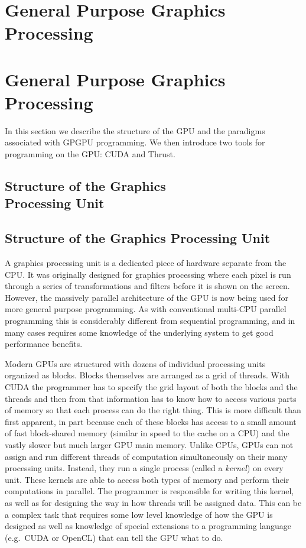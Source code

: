 \documentclass[twocolumn]{article}
\renewcommand{\|}{\origbar} %
\begin{document}
\if@twocolumn
  \section{General Purpose Graphics \\ Processing}
\else
  \section{General Purpose Graphics Processing}
\fi 
\label{sec:GPGP}

In this section we describe the structure of the GPU and the paradigms associated with GPGPU programming. We then introduce two tools for programming on the GPU: CUDA and Thrust.

\if@twocolumn
  \subsection{Structure of the Graphics \\ Processing Unit}
\else
  \subsection{Structure of the Graphics Processing Unit}
\fi

A graphics processing unit is a dedicated piece of hardware separate from the CPU. It was originally designed for graphics processing where each pixel is run through a series of transformations and filters before it is shown on the screen. However, the massively parallel architecture of the GPU is now being used for more general purpose programming. As with conventional multi-CPU parallel programming this is considerably different from sequential programming, and in many cases requires some knowledge of the underlying system to get good performance benefits. 

Modern GPUs are structured with dozens of individual processing units organized as blocks. Blocks themselves are arranged as a grid of threads. With CUDA the programmer has to specify the grid layout of both the blocks and the threads and then from that information has to know how to access various parts of memory so that each process can do the right thing. This is more difficult than first apparent, in part because each of these blocks has access to a small amount of fast block-shared memory (similar in speed to the cache on a CPU) and the vastly slower but much larger GPU main memory. Unlike CPUs, GPUs can not assign and run different threads of computation simultaneously on their many processing units. Instead, they run a single process (called a {\em kernel}) on every unit. These kernels are able to access both types of memory and perform their computations in parallel. The programmer is responsible for writing this kernel, as well as for designing the way in how threads will be assigned data. This can be a complex task that requires some low level knowledge of how the GPU is designed as well as knowledge of special extensions to a programming language (e.g.\ CUDA or OpenCL) that can tell the GPU what to do.
\end{document}
